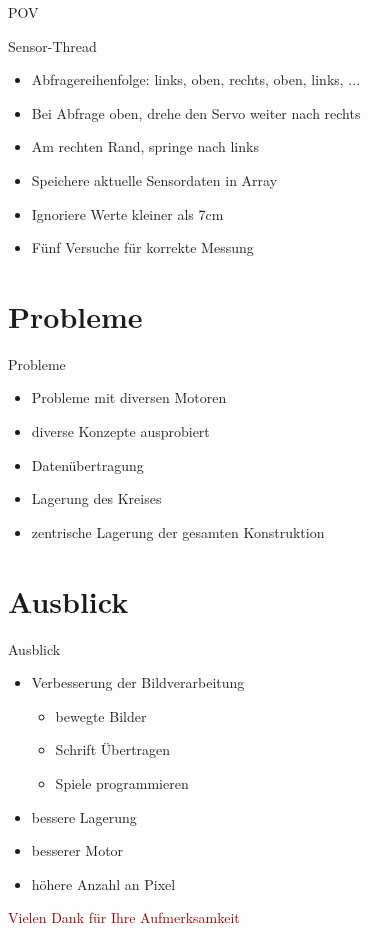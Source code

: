 \begin{frame}{POV}

\end{frame}

\begin{frame}{Sensor-Thread}
\begin{itemize}
\item Abfragereihenfolge: links, oben, rechts, oben, links, ...
\item Bei Abfrage oben, drehe den Servo weiter nach rechts
\item Am rechten Rand, springe nach links \\[0.5cm]
\item Speichere aktuelle Sensordaten in Array
\item Ignoriere Werte kleiner als 7cm
\item Fünf Versuche für korrekte Messung
\end{itemize}
\end{frame}

\section{Probleme}

\begin{frame}{Probleme}
\begin{itemize}
\item Probleme mit diversen Motoren
\item[] \rightarrow diverse Konzepte ausprobiert
\item Datenübertragung
\item Lagerung des Kreises
\item zentrische Lagerung der gesamten Konstruktion
\end{itemize}
\end{frame}

\section{Ausblick}

\begin{frame}{Ausblick}
\begin{itemize}
\item Verbesserung der Bildverarbeitung
\begin{itemize}
\item bewegte Bilder
\item Schrift Übertragen
\item Spiele programmieren
\end{itemize}
\item bessere Lagerung
\item besserer Motor
\item höhere Anzahl an Pixel
\end{itemize}
\end{frame}

\begin{frame}
\begin{center}
\textcolor{darkred}{
Vielen Dank für Ihre Aufmerksamkeit}
\end{center}
\end{frame}
